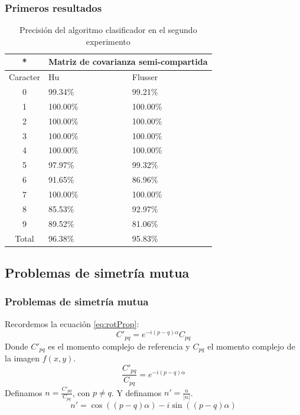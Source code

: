 \documentclass{beamer}
\begin{document}
	\begin{frame}
	\frametitle{Primeros resultados}
	\begin{table}
	\begin{center}
	\begin{tabular}{|c|p{3cm}|p{3cm}|}
		\hline
		* & \multicolumn{2}{|c|}{Matriz de covarianza semi-compartida} \\
		\hline
		Caracter & Hu & Flusser \\
		\hline
		0 & 99.34\% & 99.21\% \\
		1 & 100.00\% & 100.00\% \\
		2 & 100.00\% & 100.00\% \\
		3 & 100.00\% & 100.00\% \\
		4 & 100.00\% & 100.00\% \\		
		5 & 97.97\% & 99.32\% \\ 
		6 & 91.65\% & 86.96\% \\
		7 & 100.00\% & 100.00\% \\
		8 & 85.53\% & 92.97\% \\
		9 & 89.52\% & 81.06\% \\
		\hline
		Total & 96.38\% & 95.83\% \\
		\hline
	\end{tabular}
	\end{center}
	\caption{Precisión del algoritmo clasificador en el segundo experimento}	
	\label{tb:exp1_2}
	\end{table}
	\end{frame}
	
	\subsection{Problemas de simetría mutua}
	
	\begin{frame}
	\frametitle{Problemas de simetría mutua}
	Recordemos la ecuación \ref{eq:rotProp}:
	\[ C'_{pq} = e^{-i(p-q)\alpha}C_{pq} \]
	Donde $C'_{pq}$ es el momento complejo de referencia y $C_{pq}$ el momento complejo de la imagen $f(x,y)$.
	\begin{equation}\label{eq:angleDetection1}
		\frac{C'_{pq}}{C_{pq}} = e^{-i(p-q)\alpha}
	\end{equation}
	Definamos $n=\frac{C'_{pq}}{C_{pq}}$, con $p \neq q$. Y definamos $n'=\frac{n}{|n|}$.
	\begin{equation}\label{angleDetection2}
		n' = \cos((p-q)\alpha) - i\sin((p-q)\alpha)
	\end{equation}	
	\end{frame}
	
\end{document}
